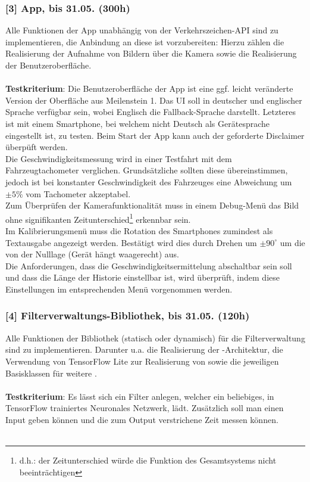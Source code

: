 \subsubsection{[3] App, bis 31.05. (300h)}
Alle Funktionen der \gls{App} unabhängig von der \gls{Verkehrszeichen-API} sind zu implementieren, die Anbindung an diese ist vorzubereiten: Hierzu zählen die Realisierung der Aufnahme von Bildern über die Kamera sowie die Realisierung der Benutzeroberfläche.\\
\\
\textbf{Testkriterium}: Die Benutzeroberfläche der App ist eine ggf. leicht veränderte Version der Oberfläche aus Meilenstein 1. Das \gls{UI} soll in deutscher und englischer Sprache verfügbar sein, wobei Englisch die Fallback-Sprache darstellt. Letzteres ist mit einem \gls{Smartphone}, bei welchem nicht Deutsch als Gerätesprache eingestellt ist, zu testen. Beim Start der \gls{App} kann auch der geforderte Disclaimer überpüft werden.\\
Die Geschwindigkeitsmessung wird in einer Testfahrt mit dem Fahrzeugtachometer verglichen. Grundsätzliche sollten diese übereinstimmen, jedoch ist bei konstanter Geschwindigkeit des Fahrzeuges eine Abweichung um $\pm 5\%$ vom Tachometer akzeptabel.\\
Zum Überprüfen der Kamerafunktionalität muss in einem Debug-Menü das Bild ohne signifikanten Zeitunterschied\footnote{d.h.: der Zeitunterschied würde die Funktion des Gesamtsystems nicht beeinträchtigen} erkennbar sein.\\
Im Kalibrierungsmenü muss die Rotation des \gls{Smartphone}s zumindest als Textausgabe angezeigt werden. Bestätigt wird dies durch Drehen um $\pm90^\circ$ um die  von der Nulllage (Gerät hängt waagerecht) aus.\\
Die Anforderungen, dass die Geschwindigkeitsermittelung abschaltbar sein soll und dass die Länge der Historie einstellbar ist, wird überprüft, indem diese Einstellungen im entsprechenden Menü vorgenommen werden. \\

\subsubsection{[4] Filterverwaltungs-Bibliothek, bis 31.05. (120h)}
Alle Funktionen der Bibliothek (statisch oder dynamisch) für die Filterverwaltung sind zu implementieren. Darunter u.a. die Realisierung der -Architektur, die Verwendung von \gls{TensorFlow Lite} zur Realisierung von  sowie die jeweiligen Basisklassen für weitere .\\
\\
\textbf{Testkriterium}: Es lässt sich ein Filter anlegen, welcher ein beliebiges, in TensorFlow trainiertes \gls{Neuronales Netzwerk}, lädt. Zusätzlich soll man einen Input geben können und die zum Output verstrichene Zeit messen können.\\
\\
